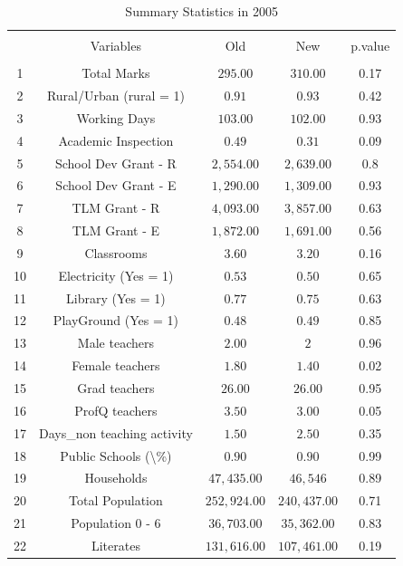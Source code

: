 \documentclass[12pt, a4paper]{article}
\begin{document}
	\begin{table}[!htbp] \centering 
		\caption{Summary Statistics in 2005} 
		\label{} 
		\begin{tabular}{@{\extracolsep{5pt}} ccccc} 
			\\[-1.8ex]\hline 
			\hline \\[-1.8ex] 
			& Variables & Old & New & p.value \\ 
			\hline \\[-1.8ex] 
			1 & Total Marks & $295.00$ & $310.00$ & 0.17 \\ 
			2 & Rural/Urban (rural = 1) & $0.91$ & $0.93$ & 0.42 \\ 
			3 & Working Days & $103.00$ & $102.00$ & 0.93 \\ 
			4 & Academic Inspection & $0.49$ & $0.31$ & 0.09 \\ 
			5 & School Dev Grant - R & $2,554.00$ & $2,639.00$ & 0.8 \\ 
			6 & School Dev Grant - E & $1,290.00$ & $1,309.00$ & 0.93 \\ 
			7 & TLM Grant - R & $4,093.00$ & $3,857.00$ & 0.63 \\ 
			8 & TLM Grant - E & $1,872.00$ & $1,691.00$ & 0.56 \\ 
			9 & Classrooms & $3.60$ & $3.20$ & 0.16 \\ 
			10 & Electricity (Yes = 1) & $0.53$ & $0.50$ & 0.65 \\ 
			11 & Library  (Yes = 1) & $0.77$ & $0.75$ & 0.63 \\ 
			12 & PlayGround  (Yes = 1) & $0.48$ & $0.49$ & 0.85 \\ 
			13 & Male teachers & $2.00$ & $2$ & 0.96 \\ 
			14 & Female teachers & $1.80$ & $1.40$ & 0.02 \\ 
			15 & Grad teachers & $26.00$ & $26.00$ & 0.95 \\ 
			16 & ProfQ teachers & $3.50$ & $3.00$ & 0.05 \\ 
			17 & Days\_non teaching activity & $1.50$ & $2.50$ & 0.35 \\ 
			18 & Public Schools (\textbackslash \%) & $0.90$ & $0.90$ & 0.99 \\ 
			19 & Households & $47,435.00$ & $46,546$ & 0.89 \\ 
			20 & Total Population & $252,924.00$ & $240,437.00$ & 0.71 \\ 
			21 & Population 0 - 6 & $36,703.00$ & $35,362.00$ & 0.83 \\ 
			22 & Literates & $131,616.00$ & $107,461.00$ & 0.19 \\ 

\end{tabular}
\end{table}
\end{document}
